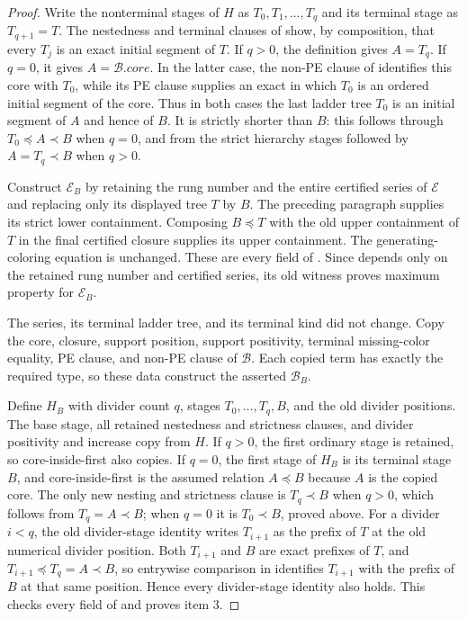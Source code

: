 \begin{proof}
Write the nonterminal stages of $H$ as
$T_0,T_1,\ldots,T_q$ and its terminal stage as $T_{q+1}=T$.
The nestedness and terminal clauses of
 show, by composition, that every $T_j$ is
an exact initial segment of $T$.  If $q>0$, the definition
 gives $A=T_q$.  If $q=0$, it gives
$A=\mathcal B.\mathit{core}$.  In the latter case, the non-PE clause of
 identifies this core with $T_0$, while its PE
clause supplies an exact  in which $T_0$ is
an ordered initial segment of the core.  Thus in both cases
the last ladder tree $T_0$ is an initial segment of $A$ and hence of
$B$.  It is strictly shorter than $B$: this follows through
$T_0\preccurlyeq A\prec B$ when $q=0$, and from the strict hierarchy
stages followed by $A=T_q\prec B$ when $q>0$.

Construct $\mathcal E_B$ by retaining the rung number and the entire
certified series of $\mathcal E$ and replacing only its displayed tree
$T$ by $B$.  The preceding paragraph supplies its strict lower
containment.  Composing $B\preccurlyeq T$ with the old upper containment
of $T$ in the final certified closure supplies its upper containment.
The generating-coloring equation is unchanged.  These are every field
of .  Since
 depends only on the retained rung number and
certified series, its old witness proves maximum property for
$\mathcal E_B$.

The series, its terminal ladder tree, and its terminal kind did not
change.  Copy the core, closure, support position, support positivity,
terminal missing-color equality, PE clause, and non-PE clause of
$\mathcal B$.  Each copied term has exactly the required type, so these
data construct the asserted  $\mathcal B_B$.

Define $H_B$ with divider count $q$, stages $T_0,\ldots,T_q,B$, and the
old divider positions.  The base stage, all retained nestedness and
strictness clauses, and divider positivity and increase copy from $H$.
If $q>0$, the first ordinary stage is retained, so core-inside-first
also copies.  If $q=0$, the first stage of $H_B$ is its terminal stage
$B$, and core-inside-first is the assumed relation $A\preccurlyeq B$
because $A$ is the copied core.  The only new nesting and
strictness clause is $T_q\prec B$ when $q>0$, which follows from
$T_q=A\prec B$; when $q=0$ it is $T_0\prec B$, proved above.  For a
divider $i<q$, the old divider-stage identity writes $T_{i+1}$ as the
prefix of $T$ at the old numerical divider position.  Both
$T_{i+1}$ and $B$ are exact prefixes of $T$, and
$T_{i+1}\preccurlyeq T_q=A\prec B$, so entrywise comparison in
 identifies $T_{i+1}$ with the
prefix of $B$ at that same position.  Hence every divider-stage identity
also holds.  This checks every field of
 and proves item 3.


\end{proof}
